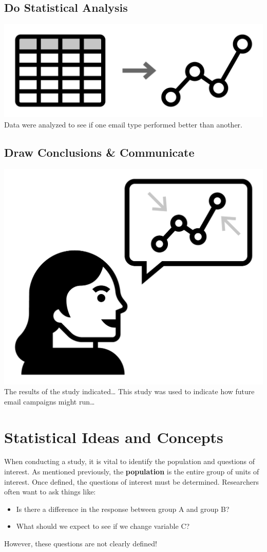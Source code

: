 \documentclass[
]{book}
\providecommand{\tightlist}{%
  \setlength{\itemsep}{0pt}\setlength{\parskip}{0pt}}
\theoremstyle{definition}
\theoremstyle{definition}
\theoremstyle{definition}
\theoremstyle{remark}
\begin{document}
\hypertarget{do-statistical-analysis-1}{%
\subsection{Do Statistical Analysis}\label{do-statistical-analysis-1}}

\includegraphics[width=0.13\linewidth,style="float:left; padding:10px"]{img/statsAnalysis}
Data were analyzed to see if one email type performed better than another.

\hypertarget{draw-conclusions-communicate-1}{%
\subsection{Draw Conclusions \& Communicate}\label{draw-conclusions-communicate-1}}

\includegraphics[width=0.13\linewidth,style="float:left; padding:10px"]{img/concludeCommunicate}
The results of the study indicated\ldots{} This study was used to indicate how future email campaigns might run\ldots{}

\hypertarget{statistical-ideas-and-concepts}{%
\section{Statistical Ideas and Concepts}\label{statistical-ideas-and-concepts}}

When conducting a study, it is vital to identify the population and questions of interest. As mentioned previously, the \textbf{population} is the entire group of units of interest. Once defined, the questions of interest must be determined. Researchers often want to ask things like:

\begin{itemize}
\tightlist
\item
  Is there a difference in the response between group A and group B?\\
\item
  What should we expect to see if we change variable C?
\end{itemize}

However, these questions are not clearly defined!
\end{document}
